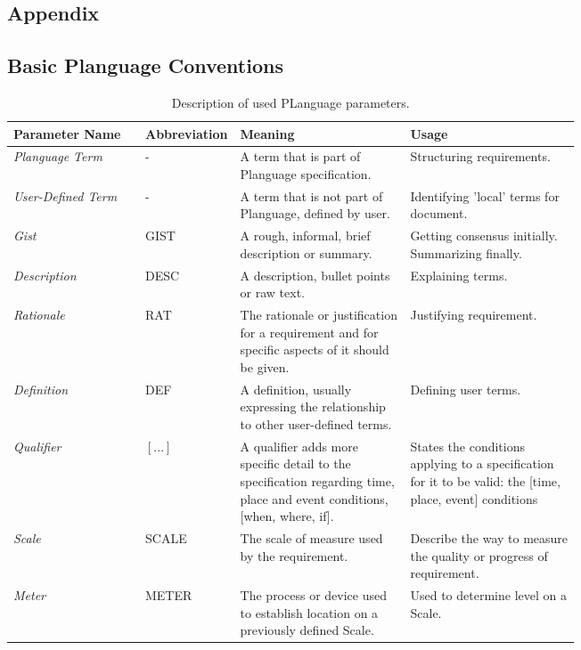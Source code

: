 \begin{appendices} 
\chapter{Appendix} \label{chp:appendix}
	\section{Basic Planguage Conventions} \label{apx:planguage-conventions}
	\begin{table}[!htbp]
		\caption[Description of used PLanguage parameters]{Description of used PLanguage parameters\footnotemark.}
		\label{tab:planguage-parameters-description}
		\centering
		\begin{tabular}{@{}lp{0.14\linewidth}p{0.3\linewidth}p{0.3\linewidth}@{}}
			\toprule
			Parameter Name & Abbreviation & Meaning & Usage \\ [0.5ex]
			\midrule
			\emph{Planguage Term}    & -       & A term that is part of Planguage specification. & Structuring requirements.\\
			\emph{User-Defined Term} & -       & A term that is not part of Planguage, defined by user. & Identifying 'local' terms for document.\\
			\emph{Gist}              & GIST    & A rough, informal, brief description or summary. & Getting consensus initially. Summarizing finally.\\	
			\emph{Description}       & DESC    & A description, bullet points or raw text. & Explaining terms. \\
			\emph{Rationale}	     & RAT	   & The rationale or justification for a requirement and for specific aspects of it should be given. & Justifying requirement.\\
			\emph{Definition}        & DEF     & A definition, usually expressing the relationship to other user-defined terms. & Defining user terms.\\
			\emph{Qualifier}         & $[...]$ & A qualifier adds more specific detail to the specification regarding time, place and event conditions, [when, where, if]. & States the conditions applying to a specification for it to be valid: the [time, place, event] conditions\\
			\emph{Scale}			 & SCALE   & The scale of measure used by the requirement. & Describe the way to measure the quality or progress of requirement.\\
			\emph{Meter}			 & METER   & The process or device used to establish location on a previously defined Scale. & Used to determine level on a Scale.\\

\end{tabular}
\end{table}
\end{appendices}
